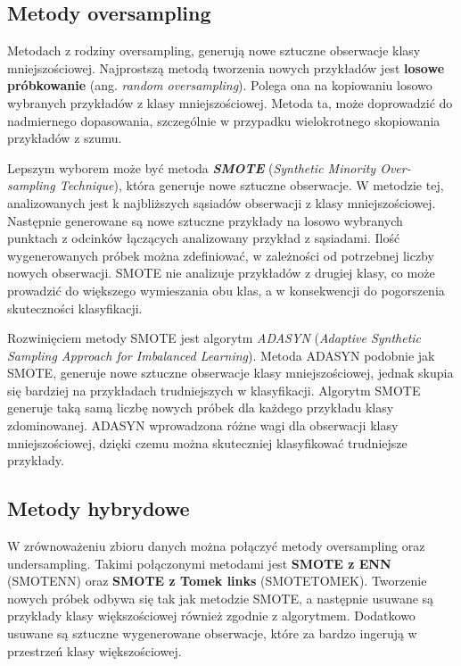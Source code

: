 \subsection{Metody oversampling}
Metodach z rodziny oversampling, generują nowe sztuczne obserwacje klasy mniejszościowej. Najprostszą metodą tworzenia nowych przykładów jest \textbf{losowe próbkowanie} (ang. \textit{random oversampling}). Polega ona na kopiowaniu losowo wybranych przykładów z klasy mniejszościowej. Metoda ta, może doprowadzić do nadmiernego dopasowania, szczególnie w przypadku wielokrotnego skopiowania przykładów z szumu. \par
Lepszym wyborem może być metoda \textbf{\textit{SMOTE}} (\textit{Synthetic Minority Over-sampling Technique}), która generuje nowe sztuczne obserwacje. W metodzie tej, analizowanych jest k najbliższych sąsiadów obserwacji z klasy mniejszościowej. Następnie generowane są nowe sztuczne przykłady na losowo wybranych punktach z odcinków łączących analizowany przykład z sąsiadami. Ilość wygenerowanych próbek można zdefiniować, w zależności od potrzebnej liczby nowych obserwacji. SMOTE nie analizuje przykładów z drugiej klasy, co może prowadzić do większego wymieszania obu klas, a w konsekwencji do pogorszenia skuteczności klasyfikacji. \par
Rozwinięciem metody SMOTE jest algorytm \textit{ADASYN} (\textit{Adaptive Synthetic Sampling Approach for Imbalanced Learning}). Metoda ADASYN podobnie jak SMOTE, generuje nowe sztuczne obserwacje klasy mniejszościowej, jednak skupia się bardziej na przykładach trudniejszych w klasyfikacji. Algorytm SMOTE generuje taką samą liczbę nowych próbek dla każdego przykładu klasy zdominowanej. ADASYN wprowadzona różne wagi dla obserwacji klasy mniejszościowej, dzięki czemu można skuteczniej klasyfikować trudniejsze przykłady.
\subsection{Metody hybrydowe}
W zrównoważeniu zbioru danych można połączyć metody oversampling oraz undersampling. Takimi połączonymi metodami jest \textbf{SMOTE z ENN} (SMOTENN) oraz \textbf{SMOTE z Tomek links} (SMOTETOMEK). Tworzenie nowych próbek odbywa się tak jak metodzie SMOTE, a następnie usuwane są przykłady klasy większościowej również zgodnie z algorytmem. Dodatkowo usuwane są sztuczne wygenerowane obserwacje, które za bardzo ingerują w przestrzeń klasy większościowej.
